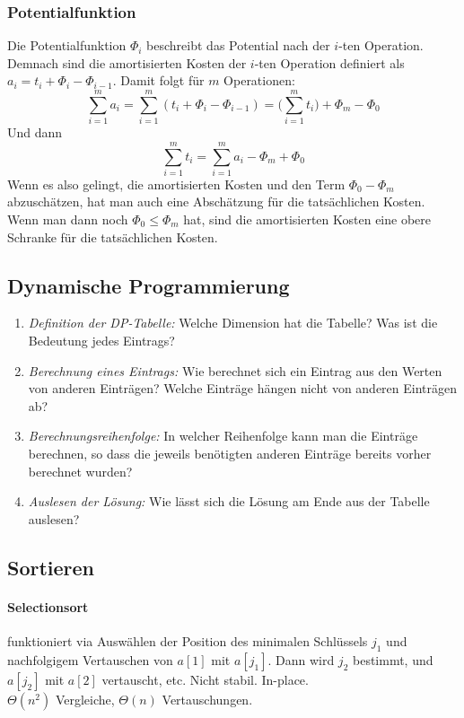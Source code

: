 \documentclass[a4paper, 9pt, DIV=20]{scrartcl}
\newcommand{\Th}{\Theta}
\begin{document}
\subsubsection{Potentialfunktion}
Die Potentialfunktion $\Phi_{i}$ beschreibt das Potential nach der $i$-ten Operation. Demnach sind die amortisierten Kosten der $i$-ten Operation definiert als $a_{i}=t_{i}+\Phi_{i}-\Phi_{i-1}$. Damit folgt für $m$ Operationen: \[ \sum_{i=1}^{m}{a_{i}} = \sum_{i=1}^{m}{(t_{i}+\Phi_{i}-\Phi_{i-1})} = \Bigg( \sum_{i=1}^{m}{t_{i}}\Bigg) + \Phi_{m} - \Phi_{0}\]
Und dann \[ \sum_{i=1}^{m}{t_{i}} = \sum_{i=1}^{m}{a_{i}} - \Phi_{m} + \Phi_{0} \]
Wenn es also gelingt, die amortisierten Kosten und den Term $\Phi_{0} - \Phi_{m}$ abzuschätzen, hat man auch eine Abschätzung für die tatsächlichen Kosten. Wenn man dann noch $\Phi_{0} \leq \Phi_{m}$ hat, sind die amortisierten Kosten eine obere Schranke für die tatsächlichen Kosten.

\subsection{Dynamische Programmierung}
\begin{enumerate}
\item \emph{Definition der DP-Tabelle:} Welche Dimension hat die Tabelle? Was ist die Bedeutung jedes Eintrags?
\item \emph{Berechnung eines Eintrags:} Wie berechnet sich ein Eintrag aus den Werten von anderen Einträgen? Welche Einträge hängen nicht von anderen Einträgen ab?
\item \emph{Berechnungsreihenfolge:} In welcher Reihenfolge kann man die Einträge berechnen, so dass die jeweils benötigten anderen Einträge bereits vorher berechnet wurden?
\item \emph{Auslesen der Lösung:} Wie lässt sich die Lösung am Ende aus der Tabelle auslesen?
\end{enumerate}

\subsection{Sortieren}
\paragraph{Selectionsort} funktioniert via Auswählen der Position des minimalen Schlüssels $j_{1}$ und nachfolgigem Vertauschen von $a[1]$ mit $a[j_{1}]$. Dann wird $j_{2}$ bestimmt, und $a[j_{2}]$ mit $a[2]$ vertauscht, etc. Nicht stabil. In-place.\\
$\Th(n^{2})$ Vergleiche, $\Th(n)$ Vertauschungen.
\end{document}
